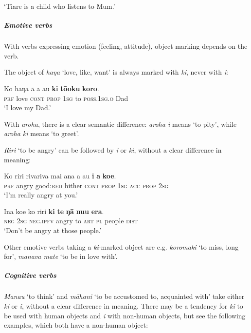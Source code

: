 \glt 
‘Tiare is a child who listens to Mum.’ \textstyleExampleref{[R492.009]} 
\z

\subparagraph{Emotive verbs} With verbs expressing emotion (feeling, attitude), object marking depends on the verb. 

The object of \textit{haŋa} ‘love, like, want’ is always marked with \textit{ki}, never with \textit{i}:

\ea\label{ex:8.117}
\gll Ko haŋa {\ꞌ}ā a au \textbf{ki} \textbf{tō{\ꞌ}oku} \textbf{koro}. \\
\textsc{prf} love \textsc{cont} \textsc{prop} \textsc{1sg} to \textsc{poss.1sg.o} Dad \\

\glt
‘I love my Dad.’ \textstyleExampleref{[R210.115]} 
\z

With \textit{{\ꞌ}aroha}, there is a clear semantic difference: \textit{{\ꞌ}aroha i} means ‘to pity’, while \textit{{\ꞌ}aroha ki} means ‘to greet’.

\textit{Riri} ‘to be angry’ can be followed by \textit{i} or \textit{ki}, without a clear difference in meaning:

\ea\label{ex:8.118}
\gll Ko riri rivariva mai {\ꞌ}ana a au \textbf{i} \textbf{a} \textbf{koe}. \\
\textsc{prf} angry good:\textsc{red} hither \textsc{cont} \textsc{prop} \textsc{1sg} \textsc{acc} \textsc{prop} \textsc{2sg} \\

\glt 
‘I’m really angry at you.’ \textstyleExampleref{[R229.362]} 
\z

\ea\label{ex:8.119}
\gll {\ꞌ}Ina koe ko riri \textbf{ki} \textbf{te} \textbf{ŋā} \textbf{nu{\ꞌ}u} \textbf{era}. \\
\textsc{neg} \textsc{2sg} \textsc{neg.ipfv} angry to \textsc{art} \textsc{pl} people \textsc{dist} \\

\glt
‘Don’t be angry at those people.’ \textstyleExampleref{[R229.331]} 
\z

Other emotive verbs taking a \textit{ki}{}-marked object are e.g. \textit{koromaki} ‘to miss, long for’, \textit{manava mate} ‘to be in love with’.

\subparagraph{Cognitive verbs} \textit{Mana{\ꞌ}u} ‘to think’ and \textit{māhani} ‘to be accustomed to, acquainted with’ take either \textit{ki} or \textit{i}, without a clear difference in meaning. There may be a tendency for \textit{ki} to be used with human objects and \textit{i} with non-human objects, but see the following examples, which both have a non-human object:

